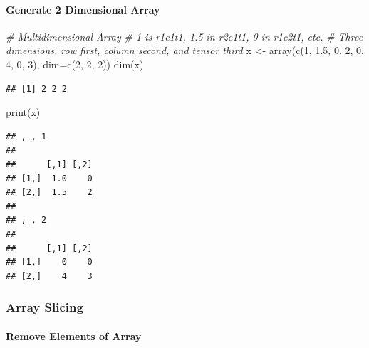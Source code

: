 \documentclass[
]{book}
\newenvironment{Shaded}{\begin{snugshade}}{\end{snugshade}}
\newcommand{\AttributeTok}[1]{\textcolor[rgb]{0.77,0.63,0.00}{#1}}
\newcommand{\CommentTok}[1]{\textcolor[rgb]{0.56,0.35,0.01}{\textit{#1}}}
\newcommand{\DecValTok}[1]{\textcolor[rgb]{0.00,0.00,0.81}{#1}}
\newcommand{\FloatTok}[1]{\textcolor[rgb]{0.00,0.00,0.81}{#1}}
\newcommand{\FunctionTok}[1]{\textcolor[rgb]{0.00,0.00,0.00}{#1}}
\newcommand{\NormalTok}[1]{#1}
\newcommand{\OtherTok}[1]{\textcolor[rgb]{0.56,0.35,0.01}{#1}}
\begin{document}
\hypertarget{generate-2-dimensional-array}{%
\paragraph{Generate 2 Dimensional Array}\label{generate-2-dimensional-array}}

\begin{Shaded}
\begin{Highlighting}[]
\CommentTok{\# Multidimensional Array}
\CommentTok{\# 1 is r1c1t1, 1.5 in r2c1t1, 0 in r1c2t1, etc.}
\CommentTok{\# Three dimensions, row first, column second, and tensor third}
\NormalTok{x }\OtherTok{\textless{}{-}} \FunctionTok{array}\NormalTok{(}\FunctionTok{c}\NormalTok{(}\DecValTok{1}\NormalTok{, }\FloatTok{1.5}\NormalTok{, }\DecValTok{0}\NormalTok{, }\DecValTok{2}\NormalTok{, }\DecValTok{0}\NormalTok{, }\DecValTok{4}\NormalTok{, }\DecValTok{0}\NormalTok{, }\DecValTok{3}\NormalTok{), }\AttributeTok{dim=}\FunctionTok{c}\NormalTok{(}\DecValTok{2}\NormalTok{, }\DecValTok{2}\NormalTok{, }\DecValTok{2}\NormalTok{))}
\FunctionTok{dim}\NormalTok{(x)}
\end{Highlighting}
\end{Shaded}

\begin{verbatim}
## [1] 2 2 2
\end{verbatim}

\begin{Shaded}
\begin{Highlighting}[]
\FunctionTok{print}\NormalTok{(x)}
\end{Highlighting}
\end{Shaded}

\begin{verbatim}
## , , 1
## 
##      [,1] [,2]
## [1,]  1.0    0
## [2,]  1.5    2
## 
## , , 2
## 
##      [,1] [,2]
## [1,]    0    0
## [2,]    4    3
\end{verbatim}

\hypertarget{array-slicing}{%
\subsubsection{Array Slicing}\label{array-slicing}}

\hypertarget{remove-elements-of-array}{%
\paragraph{Remove Elements of Array}\label{remove-elements-of-array}}
\end{document}
